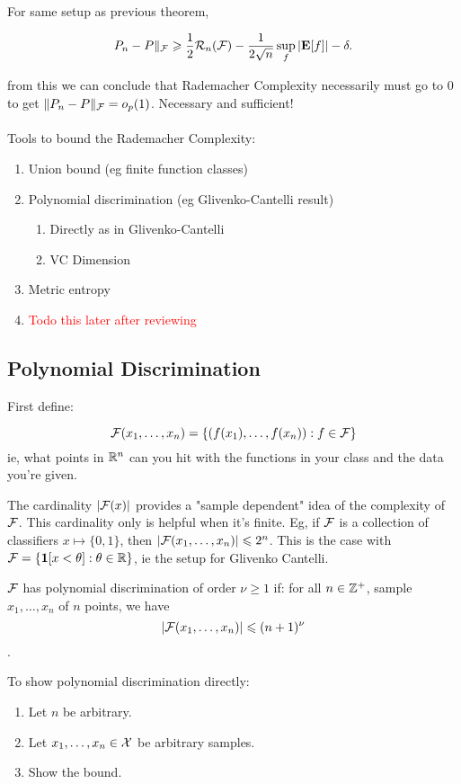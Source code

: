 \documentclass{article}
\newcommand\myworries[1]{\textcolor{red}{#1}}
\begin{document}
\begin{theorem}
For same setup as previous theorem,

$$P_n -P\|_\mathcal F \geqslant \frac{1}{2} \mathcal R_n(\mathcal F) - \frac{1}{2\sqrt{n}} \sup_f |\mathbf{E}[f]| -\delta.$$
\end{theorem}

from this we can conclude that Rademacher Complexity necessarily must go to $0$ to get $\|P_n -P\|_\mathcal F = o_p(1)$. Necessary and sufficient!\\\\
Tools to bound the Rademacher Complexity:
\begin{enumerate}
	\item Union bound (eg finite function classes)
	\item Polynomial discrimination (eg Glivenko-Cantelli result)
	\begin{enumerate}
	\item Directly as in Glivenko-Cantelli
	\item VC Dimension
	\end{enumerate}
	\item Metric entropy
	\item \myworries{Todo this later after reviewing}
\end{enumerate}

\subsection{Polynomial Discrimination}
First define:

\begin{definition}
$$\mathcal F(x_1,\ldots,x_n) = \{(f(x_1),\ldots,f(x_n)): f\in \mathcal F\}$$
ie, what points in $\mathbb R^n$ can you hit with the functions in your class and the data you're given. 
\end{definition}

The cardinality $|\mathcal F(x)|$ provides a "sample dependent" idea of the complexity of $\mathcal F$. This cardinality only is helpful when it's finite.  Eg, if $\mathcal F$ is a collection of classifiers $x\mapsto \{0,1\}$, then $|\mathcal F(x_1,\ldots,x_n)|\leqslant 2^n$. This is the case with $\mathcal F = \{\boldsymbol{1}[x<\theta]: \theta\in \mathbb R\}$, ie the setup for Glivenko Cantelli. 

\begin{definition}
$\mathcal F$ has polynomial discrimination of order $\nu\geq 1$ if: for all $n\in \mathbb Z^+$, sample $x_1,\ldots,x_n$ of $n$ points, we have $$|\mathcal F(x_1,\ldots,x_n)| \leqslant (n+1)^\nu$$.
\end{definition}
To show polynomial discrimination directly:
\begin{enumerate}
	\item Let $n$ be arbitrary. 
	\item Let $x_1,\ldots,x_n \in \mathcal X$ be arbitrary samples. 
	\item Show the bound.
\end{enumerate}
\end{document}
